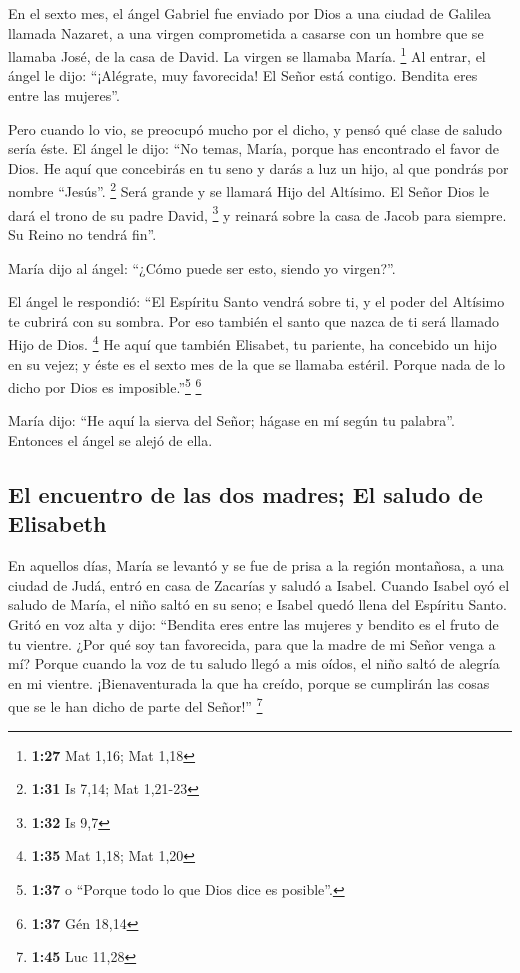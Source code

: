  En el sexto mes, el ángel Gabriel fue enviado por Dios a
una ciudad de Galilea llamada Nazaret,  a una virgen
comprometida a casarse con un hombre que se llamaba José, de la casa de
David. La virgen se llamaba María. \footnote{\textbf{1:27} Mat 1,16; Mat
  1,18}  Al entrar, el ángel le dijo: ``¡Alégrate, muy
favorecida! El Señor está contigo. Bendita eres entre las mujeres''.

 Pero cuando lo vio, se preocupó mucho por el dicho, y
pensó qué clase de saludo sería éste.  El ángel le dijo:
``No temas, María, porque has encontrado el favor de Dios.
 He aquí que concebirás en tu seno y darás a luz un hijo,
al que pondrás por nombre ``Jesús''. \footnote{\textbf{1:31} Is 7,14;
  Mat 1,21-23}  Será grande y se llamará Hijo del
Altísimo. El Señor Dios le dará el trono de su padre David, \footnote{\textbf{1:32}
  Is 9,7}  y reinará sobre la casa de Jacob para siempre.
Su Reino no tendrá fin''.

 María dijo al ángel: ``¿Cómo puede ser esto, siendo yo
virgen?''.

 El ángel le respondió: ``El Espíritu Santo vendrá sobre
ti, y el poder del Altísimo te cubrirá con su sombra. Por eso también el
santo que nazca de ti será llamado Hijo de Dios. \footnote{\textbf{1:35}
  Mat 1,18; Mat 1,20}  He aquí que también Elisabet, tu
pariente, ha concebido un hijo en su vejez; y éste es el sexto mes de la
que se llamaba estéril.  Porque nada de lo dicho por Dios
es imposible.''\footnote{\textbf{1:37} o ``Porque todo lo que Dios dice
  es posible''.} \footnote{\textbf{1:37} Gén 18,14}

 María dijo: ``He aquí la sierva del Señor; hágase en mí
según tu palabra''. Entonces el ángel se alejó de ella.

\hypertarget{el-encuentro-de-las-dos-madres-el-saludo-de-elisabeth}{%
\subsection{El encuentro de las dos madres; El saludo de
Elisabeth}\label{el-encuentro-de-las-dos-madres-el-saludo-de-elisabeth}}

 En aquellos días, María se levantó y se fue de prisa a
la región montañosa, a una ciudad de Judá,  entró en casa
de Zacarías y saludó a Isabel.  Cuando Isabel oyó el
saludo de María, el niño saltó en su seno; e Isabel quedó llena del
Espíritu Santo.  Gritó en voz alta y dijo: ``Bendita eres
entre las mujeres y bendito es el fruto de tu vientre. 
¿Por qué soy tan favorecida, para que la madre de mi Señor venga a mí?
 Porque cuando la voz de tu saludo llegó a mis oídos, el
niño saltó de alegría en mi vientre.  ¡Bienaventurada la
que ha creído, porque se cumplirán las cosas que se le han dicho de
parte del Señor!'' \footnote{\textbf{1:45} Luc 11,28}

